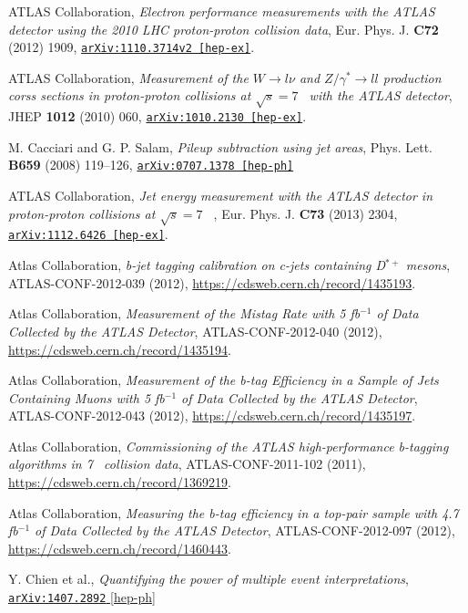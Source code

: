 ATLAS Collaboration, \emph{Electron performance measurements with the ATLAS detector using the 2010 LHC proton-proton collision data}, Eur. Phys. J. \textbf{C72} (2012) 1909, \href{http://arxiv.org/abs/1110.3174v2}{\texttt{arXiv:1110.3714v2 [hep-ex]}}.

ATLAS Collaboration, \emph{Measurement of the $W\to l\nu$ and $Z/\gamma^*\to ll$ production corss sections in proton-proton collisions at $\sqrt{s}=7$ \TeV\ with the ATLAS detector}, JHEP \textbf{1012} (2010) 060, \href{http://arxiv.org/abs/1010.2130}{\texttt{arXiv:1010.2130 [hep-ex]}}.

M. Cacciari and G. P. Salam, \emph{Pileup subtraction using jet areas}, Phys. Lett. \textbf{B659} (2008) 119--126, \href{http://arxiv.org/abs/0707.1378}{\texttt{arXiv:0707.1378 [hep-ph]}}

ATLAS Collaboration, \emph{Jet energy measurement with the ATLAS detector in proton-proton collisions at $\sqrt{s}=7$ \TeV\ }, Eur. Phys. J. \textbf{C73} (2013) 2304, \href{http://arxiv.org/abs/1112.6426}{\texttt{arXiv:1112.6426 [hep-ex]}}.

Atlas Collaboration, \emph{b-jet tagging calibration on c-jets containing D$^{*+}$ mesons}, ATLAS-CONF-2012-039 (2012), \url{https://cdsweb.cern.ch/record/1435193}.

Atlas Collaboration, \emph{Measurement of the Mistag Rate with 5 fb$^{-1}$ of Data Collected by the ATLAS Detector}, ATLAS-CONF-2012-040 (2012), \url{https://cdsweb.cern.ch/record/1435194}.

Atlas Collaboration, \emph{Measurement of the b-tag Efficiency in a Sample of Jets Containing Muons with 5 fb$^{-1}$ of Data Collected by the ATLAS Detector}, ATLAS-CONF-2012-043 (2012), \url{https://cdsweb.cern.ch/record/1435197}.

Atlas Collaboration, \emph{Commissioning of the ATLAS high-performance b-tagging algorithms in 7 \TeV\ collision data}, ATLAS-CONF-2011-102 (2011), \url{https://cdsweb.cern.ch/record/1369219}.

Atlas Collaboration, \emph{Measuring the b-tag efficiency in a top-pair sample with 4.7 fb$^{-1}$ of Data Collected by the ATLAS Detector}, ATLAS-CONF-2012-097 (2012), \url{https://cdsweb.cern.ch/record/1460443}.

Y. Chien et al., \emph{Quantifying the power of multiple event interpretations}, \href{http://arxiv.org/abs/1407.2892}{\texttt{arXiv:1407.2892} [hep-ph]}

